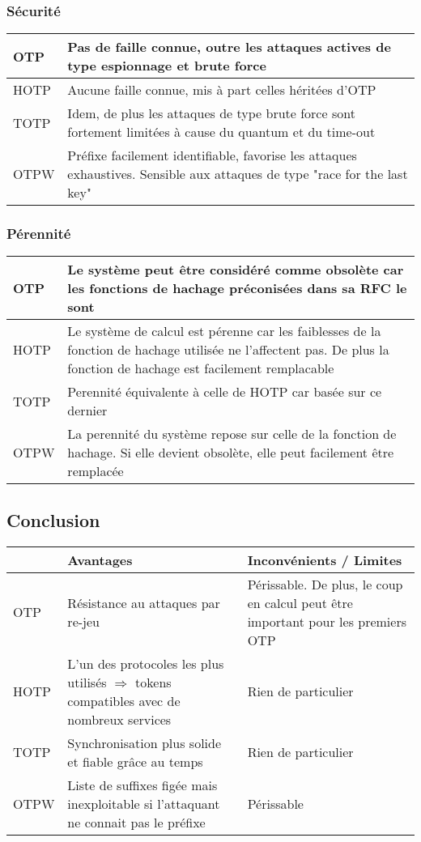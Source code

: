 \subsubsection{Sécurité}

	\begin{tabular}{| p{3cm} | p{12cm} |}
		\hline
		OTP & Pas de faille connue, outre les attaques actives de type
		espionnage et brute force \\
		\hline
		HOTP & Aucune faille connue, mis à part celles héritées d'OTP \\
		\hline
		TOTP & Idem, de plus les attaques de type brute force sont fortement
		limitées à cause du quantum et du time-out \\
		\hline
		OTPW & Préfixe facilement identifiable, favorise les attaques
		exhaustives. Sensible aux attaques de type "race for the last key" \\
		\hline
	\end{tabular}

\subsubsection{Pérennité}

	\begin{tabular}{| p{3cm} | p{12cm} |}
		\hline
		OTP & Le système peut être considéré comme obsolète car les fonctions
		de hachage préconisées dans sa RFC le sont \\
		\hline
		HOTP & Le système de calcul est	pérenne car les faiblesses de la
		fonction de hachage utilisée ne l'affectent pas. De plus la fonction
		de hachage est facilement remplacable \\
		\hline
		TOTP & Perennité équivalente à celle de HOTP car basée sur ce dernier
		\\
		\hline
		OTPW & La perennité du système repose sur celle de la fonction de
		hachage. Si elle devient obsolète, elle peut facilement être remplacée
		\\
		\hline
	\end{tabular}

\subsection{Conclusion}

	\begin{tabular}{| p{3cm} | p{6cm} | p{6cm} |}
		\hline
		& \cellcolor{gray} Avantages & \cellcolor{gray} Inconvénients /
		Limites \\
		\hline
		OTP & Résistance au attaques par re-jeu & Périssable. De plus, le coup en
		calcul peut être important pour les premiers OTP \\
		\hline
		HOTP & L'un des protocoles les plus utilisés $\Rightarrow$ tokens
		compatibles avec de nombreux services & Rien de particulier \\
		\hline
		TOTP & Synchronisation plus solide et fiable grâce au temps & Rien de
		particulier \\
		\hline
		OTPW & Liste de suffixes figée mais inexploitable si l'attaquant ne
		connait pas le préfixe & Périssable \\
		\hline
	\end{tabular}

